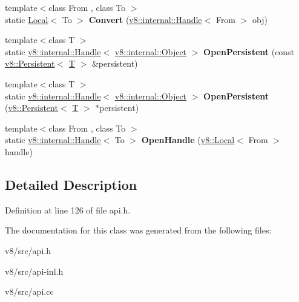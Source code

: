 \begin{DoxyCompactItemize}
\item 
\mbox{\label{classv8_1_1Utils_a0e1a705cfe27af470d6c8e1492a7755a}} 
{\footnotesize template$<$class From , class To $>$ }\\static \mbox{\hyperlink{classv8_1_1Local}{Local}}$<$ To $>$ {\bfseries Convert} (\mbox{\hyperlink{classv8_1_1internal_1_1Handle}{v8\+::internal\+::\+Handle}}$<$ From $>$ obj)
\item 
\mbox{\label{classv8_1_1Utils_a9ab1c52f245ffcabe1335485298ab29c}} 
{\footnotesize template$<$class T $>$ }\\static \mbox{\hyperlink{classv8_1_1internal_1_1Handle}{v8\+::internal\+::\+Handle}}$<$ \mbox{\hyperlink{classv8_1_1internal_1_1Object}{v8\+::internal\+::\+Object}} $>$ {\bfseries Open\+Persistent} (const \mbox{\hyperlink{classv8_1_1Persistent}{v8\+::\+Persistent}}$<$ \mbox{\hyperlink{classv8_1_1internal_1_1torque_1_1T}{T}} $>$ \&persistent)
\item 
\mbox{\label{classv8_1_1Utils_a0638ee97beb33d821220b91f47cff4dd}} 
{\footnotesize template$<$class T $>$ }\\static \mbox{\hyperlink{classv8_1_1internal_1_1Handle}{v8\+::internal\+::\+Handle}}$<$ \mbox{\hyperlink{classv8_1_1internal_1_1Object}{v8\+::internal\+::\+Object}} $>$ {\bfseries Open\+Persistent} (\mbox{\hyperlink{classv8_1_1Persistent}{v8\+::\+Persistent}}$<$ \mbox{\hyperlink{classv8_1_1internal_1_1torque_1_1T}{T}} $>$ $\ast$persistent)
\item 
\mbox{\label{classv8_1_1Utils_a607b2ed012097b00edf6d9cc41ce30b3}} 
{\footnotesize template$<$class From , class To $>$ }\\static \mbox{\hyperlink{classv8_1_1internal_1_1Handle}{v8\+::internal\+::\+Handle}}$<$ To $>$ {\bfseries Open\+Handle} (\mbox{\hyperlink{classv8_1_1Local}{v8\+::\+Local}}$<$ From $>$ handle)
\end{DoxyCompactItemize}


\subsection{Detailed Description}


Definition at line 126 of file api.\+h.



The documentation for this class was generated from the following files\+:\begin{DoxyCompactItemize}
\item 
v8/src/api.\+h\item 
v8/src/api-\/inl.\+h\item 
v8/src/api.\+cc\end{DoxyCompactItemize}
